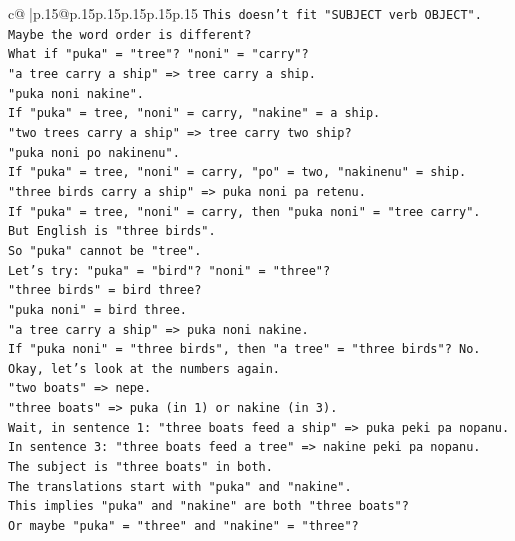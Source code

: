 \documentclass{article}
\begin{document}
{\begin{supertabular}{c@{$\;$}|p{.15\linewidth}@{}p{.15\linewidth}p{.15\linewidth}p{.15\linewidth}p{.15\linewidth}p{.15\linewidth}}
{{{\texttt{This doesn't fit "SUBJECT verb OBJECT".} \\
\texttt{Maybe the word order is different?} \\
\texttt{What if "puka" = "tree"? "noni" = "carry"?} \\
\texttt{"a tree carry a ship" => tree carry a ship.} \\
\texttt{"puka noni nakine".} \\
\texttt{If "puka" = tree, "noni" = carry, "nakine" = a ship.} \\
\texttt{"two trees carry a ship" => tree carry two ship?} \\
\texttt{"puka noni po nakinenu".} \\
\texttt{If "puka" = tree, "noni" = carry, "po" = two, "nakinenu" = ship.} \\
\texttt{"three birds carry a ship" => puka noni pa retenu.} \\
\texttt{If "puka" = tree, "noni" = carry, then "puka noni" = "tree carry".} \\
\texttt{But English is "three birds".} \\
\texttt{So "puka" cannot be "tree".} \\
\texttt{Let's try: "puka" = "bird"? "noni" = "three"?} \\
\texttt{"three birds" = bird three?} \\
\texttt{"puka noni" = bird three.} \\
\texttt{"a tree carry a ship" => puka noni nakine.} \\
\texttt{If "puka noni" = "three birds", then "a tree" = "three birds"? No.} \\
\texttt{Okay, let's look at the numbers again.} \\
\texttt{"two boats" => nepe.} \\
\texttt{"three boats" => puka (in 1) or nakine (in 3).} \\
\texttt{Wait, in sentence 1: "three boats feed a ship" => puka peki pa nopanu.} \\
\texttt{In sentence 3: "three boats feed a tree" => nakine peki pa nopanu.} \\
\texttt{The subject is "three boats" in both.} \\
\texttt{The translations start with "puka" and "nakine".} \\
\texttt{This implies "puka" and "nakine" are both "three boats"?} \\
\texttt{Or maybe "puka" = "three" and "nakine" = "three"?} \\
}}}
\end{supertabular}}
\end{document}
